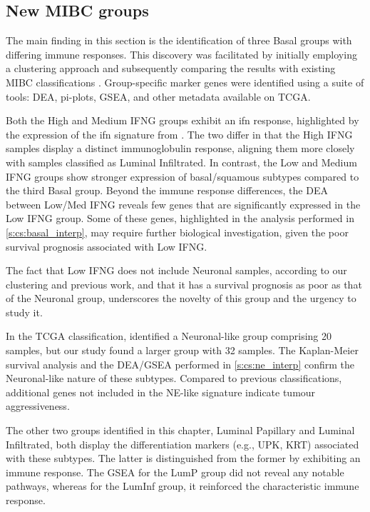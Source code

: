 \subsection*{New MIBC groups}
The main finding in this section is the identification of three Basal groups with differing immune responses. This discovery was facilitated by initially employing a  clustering approach and subsequently comparing the results with existing MIBC classifications \citet{Baker2022-bj,Marzouka2018-ge}. Group-specific marker genes were identified using a suite of tools: DEA, pi-plots, GSEA, and other metadata available on TCGA.

Both the High and Medium IFNG groups exhibit an \acrshort{ifn} response, highlighted by the expression of the \acrshort{ifn} signature from \citet{Baker2022-bj}. The two differ in that the High IFNG samples display a distinct immunoglobulin response, aligning them more closely with samples classified as Luminal Infiltrated. In contrast, the Low and Medium IFNG groups show stronger expression of basal/squamous subtypes compared to the third Basal group. Beyond the immune response differences, the DEA between Low/Med IFNG reveals few genes that are significantly expressed in the Low IFNG group. Some of these genes, highlighted in the analysis performed in \cref{s:cs:basal_interp}, may require further biological investigation, given the poor survival prognosis associated with Low IFNG.

The fact that Low IFNG does not include Neuronal samples, according to our clustering and previous work, and that it has a survival prognosis as poor as that of the Neuronal group, underscores the novelty of this group and the urgency to study it.

In the TCGA classification, \citet{Robertson2017-mg} identified a Neuronal-like group comprising 20 samples, but our study found a larger group with 32 samples. The Kaplan-Meier survival analysis and the DEA/GSEA performed in \cref{s:cs:ne_interp} confirm the Neuronal-like nature of these subtypes. Compared to previous classifications, additional genes not included in the NE-like signature indicate tumour aggressiveness.

The other two groups identified in this chapter, Luminal Papillary and Luminal Infiltrated, both display the differentiation markers (e.g., UPK, KRT) associated with these subtypes. The latter is distinguished from the former by exhibiting an immune response. The GSEA for the LumP group did not reveal any notable pathways, whereas for the LumInf group, it reinforced the characteristic immune response.


